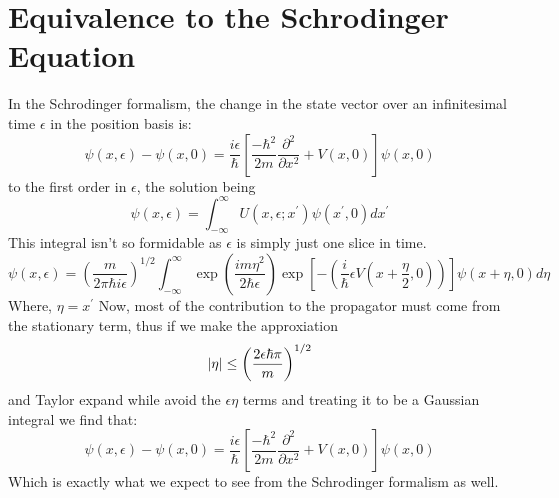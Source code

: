 \section{Equivalence to the Schrodinger Equation}
In the Schrodinger formalism, the change in the state vector over an infinitesimal time $\epsilon$ in the position basis is:
\begin{equation}
\psi (x,\epsilon) - \psi (x,0) = \frac{i \epsilon}{\hbar} \left[\frac{-\hbar^{2}}{2m} \frac{\partial^{2}}{\partial x^{2}} + V(x,0)\right] \psi (x,0)
\end{equation}
to the first order in $\epsilon$, the solution being
\begin{equation} 
\psi (x,\epsilon) = \int_{-\infty}^{\infty} U(x, \epsilon; x^{'}) \psi (x^{'},0) dx^{'}
\end{equation}
This integral isn't so formidable as $\epsilon$ is simply just one slice in time. 
\begin{equation}
\psi (x,\epsilon) = {\left(\frac{m}{2 \pi \hbar i \epsilon}\right)}^{1/2} \int_{-\infty}^{\infty} \exp \left(\frac{im{\eta}^{2}}{2 \hbar \epsilon}\right) \exp\left[-\left(\frac{i}{\hbar} \epsilon V \left(x + \frac{\eta}{2}, 0\right)\right)\right] \psi(x + \eta, 0) d \eta
\end{equation}
Where, $\eta = x^{'}$
Now, most of the contribution to the propagator must come from the stationary term, thus if we make the approxiation 
$$\abs{\eta} \leq {\left(\frac{2 \epsilon \hbar \pi}{m}\right)}^{1/2}$$
and Taylor expand while avoid the $\epsilon \eta$ terms and treating it to be a Gaussian integral we find that:
\begin{equation}
\psi (x,\epsilon) - \psi (x,0) = \frac{i \epsilon}{\hbar} \left[\frac{-\hbar^{2}}{2m} \frac{\partial^{2}}{\partial x^{2}} + V(x,0)\right] \psi (x,0)
\end{equation}
Which is exactly what we expect to see from the Schrodinger formalism as well.

